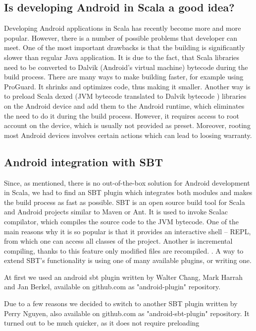 \subsection{Is developing Android in Scala a good idea?}
\label{subsec:good-idea}
Developing Android applications in Scala has recently become more and more popular. However, there is a number of possible problems that developer can meet. One of the most important drawbacks is that the building is significantly slower than regular Java application. It is due to the fact, that Scala libraries need to be converted to Dalvik (Android's virtual machine) bytecode during the build process. There are many ways to make building faster, for example using ProGuard. It shrinks and optimizes code, thus making it smaller\cite{Berkel:2012:preinstall}. Another way is to preload Scala dexed (JVM bytecode translated to Dalvik bytecode ) libraries on the Android device and add them to the Android runtime, which eliminates the need to do it during the build process\cite{Berkel:2012:preinstall}. However, it requires access to root account on the device, which is usually not provided as preset. Moreover, rooting most Android devices involves certain actions which can lead to loosing warranty. 


\subsection{Android integration with SBT}
\label{subsec:choosing-ide}
Since, as mentioned, there is no out-of-the-box solution for Android development in Scala, we had to find an SBT plugin which integrates both modules and makes the build process as fast as possible. SBT is an open source build tool for Scala and Android projects similar to Maven or Ant. It is used to invoke Scalac compilator, which compiles the source code to the JVM bytecode. One of the main reasons why it is so popular is that it provides an interactive shell -- REPL, from which one can access all classes of the project. Another is incremental compiling, thanks to this feature only modified files are recompiled. \cite{Fatin:2012:NewWay}. A way to extend SBT's functionality is using one of many available plugins, or writing one.

At first we used an android sbt plugin written by Walter Chang, Mark Harrah and Jan Berkel, available on github.com as "android-plugin" repository. 
	
Due to a few reasons we decided to switch to another SBT plugin written by Perry Nguyen, also available on github.com as "android-sbt-plugin" repository. It turned out to be much quicker, as it does not require preloading 





